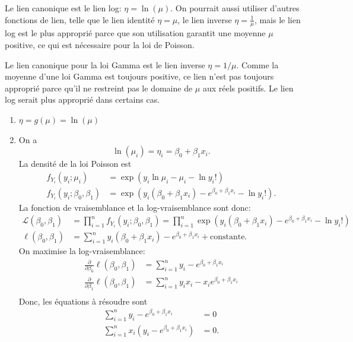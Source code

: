 \begin{solution}{5.2}
Le lien canonique est le lien log: $\eta=\ln(\mu)$. On pourrait aussi utiliser d'autres fonctions de lien, telle que le lien identité $\eta=\mu$, le lien inverse $\eta=\frac{1}{\mu}$, mais le lien log est le plus approprié parce que son utilisation garantit une moyenne $\mu$ positive, ce qui est nécessaire pour la loi de Poisson.
\end{solution}
\begin{solution}{5.3}
Le lien canonique pour la loi Gamma est le lien inverse $\eta=1/\mu$. Comme la moyenne d'une loi Gamma est toujours positive, ce lien n'est pas toujours approprié parce qu'il ne restreint pas le domaine de $\mu$ aux réels positifs. Le lien log serait plus approprié dans certains cas.
\end{solution}
\begin{solution}{5.4}
\begin{enumerate}
\item $\eta=g(\mu)=\ln(\mu)$
\item On a $$\ln(\mu_i)=\eta_i=\beta_0+\beta_1x_i.$$ La densité de la loi Poisson est
\begin{align*}
f_{Y_i}(y_i;\mu_i)&=\exp\left(y_i\ln\mu_i-\mu_i-\ln y_i!\right)\\
f_{Y_i}(y_i;\beta_0,\beta_1)&=\exp\left(y_i(\beta_0+\beta_1x_i)-e^{\beta_0+\beta_1x_i}-\ln y_i!\right).
\end{align*}
La fonction de vraisemblance et la log-vraisemblance sont donc:
\begin{align*}
\mathcal{L}(\beta_0,\beta_1)&=\prod_{i=1}^n f_{Y_i}(y_i;\beta_0,\beta_1)=\prod_{i=1}^n\exp\left(y_i(\beta_0+\beta_1x_i)-e^{\beta_0+\beta_1x_i}-\ln y_i!\right)\\
\ell(\beta_0,\beta_1)&=\sum_{i=1}^n y_i(\beta_0+\beta_1x_i)-e^{\beta_0+\beta_1x_i}+\mbox{constante}.
\end{align*}
On maximise la log-vraisemblance:
\begin{align*}
\frac{\partial}{\partial\beta_0}\ell(\beta_0,\beta_1)&=\sum_{i=1}^n y_i-e^{\beta_0+\beta_1x_i}\\
\frac{\partial}{\partial\beta_1}\ell(\beta_0,\beta_1)&=\sum_{i=1}^n y_ix_i-x_i e^{\beta_0+\beta_1x_i}\\
\end{align*}
Donc, les équations à résoudre sont
\begin{align*}
\sum_{i=1}^n y_i-e^{\beta_0+\beta_1x_i}&=0\\
\sum_{i=1}^n x_i(y_i-e^{\beta_0+\beta_1x_i})&=0.\\
\end{align*}
\end{enumerate}
\end{solution}

